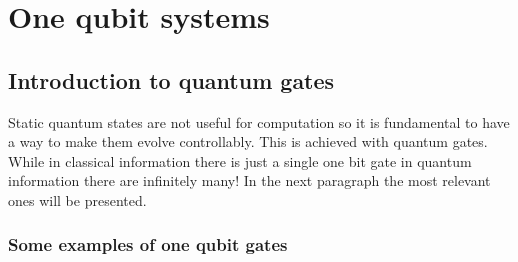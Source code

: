 \documentclass{article}
\begin{document}
\section{One qubit systems}


\subsection{Introduction to quantum gates}

Static quantum states are not useful for computation so it is
fundamental to have a way to make them evolve controllably.
This is achieved with quantum gates.\\
While in classical information there is just a single one bit
gate in quantum information there are infinitely many!
In the next paragraph the most relevant ones will be presented.


\subsubsection{Some examples of one qubit gates}
\end{document}
